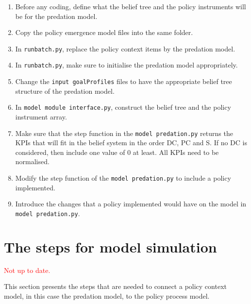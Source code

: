 \documentclass[12pt]{article}
\begin{document}
\begin{enumerate}
\item Before any coding, define what the belief tree and the policy instruments will be for the predation model.
\item Copy the policy emergence model files into the same folder.
\item In \texttt{runbatch.py}, replace the policy context items by the predation model.
\item In \texttt{runbatch.py}, make sure to initialise the predation model appropriately.
\item Change the \texttt{input goalProfiles} files to have the appropriate belief tree structure of the predation model.
\item In \texttt{model module interface.py}, construct the belief tree and the policy instrument array.
\item Make sure that the step function in the \texttt{model predation.py} returns the KPIs that will fit in the belief system in the order DC, PC and S. If no DC is considered, then include one value of 0 at least. All KPIs need to be normalised.
\item Modify the step function of the \texttt{model predation.py} to include a policy implemented.
\item Introduce the changes that a policy implemented would have on the model in \texttt{model predation.py}.
\end{enumerate}


\section{The steps for model simulation}
\label{sec:steps}

\textcolor{red}{Not up to date.}

This section presents the steps that are needed to connect a policy context model, in this case the predation model, to the policy process model.
\end{document}
